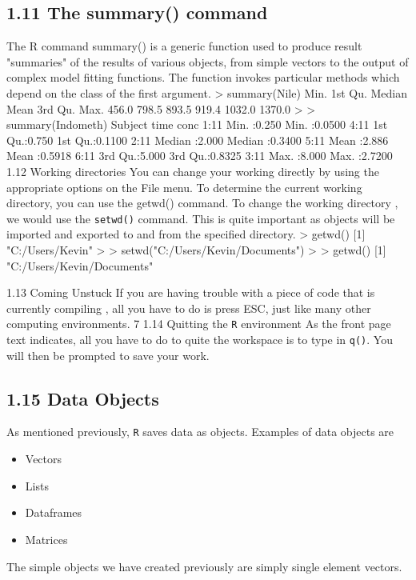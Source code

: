 \subsection{1.11 The summary() command}
The R command summary() is a generic function used to produce result "summaries" of the
results of various objects, from simple vectors to the output of complex model fitting functions.
The function invokes particular methods which depend on the class of the first argument.
> summary(Nile)
Min. 1st Qu. Median Mean 3rd Qu. Max.
456.0 798.5 893.5 919.4 1032.0 1370.0
>
> summary(Indometh)
Subject time conc
1:11 Min. :0.250 Min. :0.0500
4:11 1st Qu.:0.750 1st Qu.:0.1100
2:11 Median :2.000 Median :0.3400
5:11 Mean :2.886 Mean :0.5918
6:11 3rd Qu.:5.000 3rd Qu.:0.8325
3:11 Max. :8.000 Max. :2.7200
1.12 Working directories
You can change your working directly by using the appropriate options on the File menu. To
determine the current working directory, you can use the getwd() command. To change the
working directory , we would use the \texttt{setwd()} command. This is quite important as objects
will be imported and exported to and from the specified directory.
> getwd()
[1] "C:/Users/Kevin"
>
> setwd("C:/Users/Kevin/Documents")
>
> getwd()
[1] "C:/Users/Kevin/Documents"

1.13 Coming Unstuck
If you are having trouble with a piece of code that is currently compiling , all you have to do
is press ESC, just like many other computing environments.
7
1.14 Quitting the \texttt{R} environment
As the front page text indicates, all you have to do to quite the workspace is to type in \texttt{q()}.
You will then be prompted to save your work.

\subsection{1.15 Data Objects}
As mentioned previously, \texttt{R} saves data as objects. Examples of data objects are
\begin{itemize}
\item Vectors
\item Lists
\item Dataframes
\item Matrices
\end{itemize}
The simple objects we have created previously are simply single element vectors.


